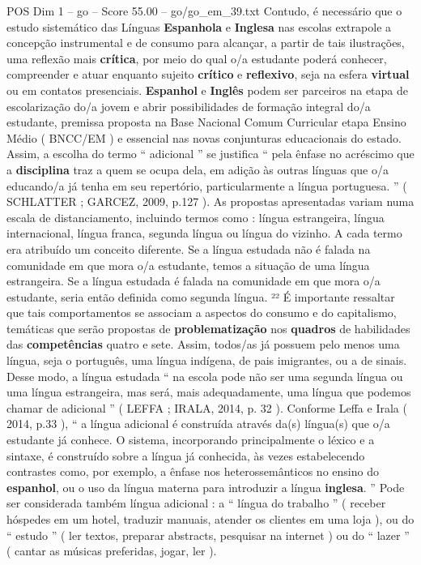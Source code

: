\begin{textsample}{POS Dim 1 – go – Score 55.00 – go/go\_em\_39.txt}
Contudo, é necessário que o estudo sistemático das Línguas \textbf{Espanhola} e \textbf{Inglesa} nas escolas extrapole a concepção instrumental e de consumo para alcançar, a partir de tais ilustrações, uma reflexão mais \textbf{crítica}, por meio do qual o/a estudante poderá conhecer, compreender e atuar enquanto sujeito \textbf{crítico} e \textbf{reflexivo}, seja na esfera \textbf{virtual} ou em contatos presenciais. \textbf{Espanhol} e \textbf{Inglês} podem ser parceiros na etapa de escolarização do/a jovem e abrir possibilidades de formação integral do/a estudante, premissa proposta na Base Nacional Comum Curricular etapa Ensino Médio ( BNCC/EM ) e essencial nas novas conjunturas educacionais do estado.
Assim, a escolha do termo “ adicional ” se justifica “ pela ênfase no acréscimo que a \textbf{disciplina} traz a quem se ocupa dela, em adição às outras línguas que o/a educando/a já tenha em seu repertório, particularmente a língua portuguesa. ” ( SCHLATTER ; GARCEZ, 2009, p.127 ).
As propostas apresentadas variam numa escala de distanciamento, incluindo termos como : língua estrangeira, língua internacional, língua franca, segunda língua ou língua do vizinho.
A cada termo era atribuído um conceito diferente.
Se a língua estudada não é falada na comunidade em que mora o/a estudante, temos a situação de uma língua estrangeira.
Se a língua estudada é falada na comunidade em que mora o/a estudante, seria então definida como segunda língua. ²² É importante ressaltar que tais comportamentos se associam a aspectos do consumo e do capitalismo, temáticas que serão propostas de \textbf{problematização} nos \textbf{quadros} de habilidades das \textbf{competências} quatro e sete.
Assim, todos/as já possuem pelo menos uma língua, seja o português, uma língua indígena, de pais imigrantes, ou a de sinais.
Desse modo, a língua estudada “ na escola pode não ser uma segunda língua ou uma língua estrangeira, mas será, mais adequadamente, uma língua que podemos chamar de adicional ” ( LEFFA ; IRALA, 2014, p. 32 ).
Conforme Leffa e Irala ( 2014, p.33 ), “ a língua adicional é construída através da(s) língua(s) que o/a estudante já conhece.
O sistema, incorporando principalmente o léxico e a sintaxe, é construído sobre a língua já conhecida, às vezes estabelecendo contrastes como, por exemplo, a ênfase nos heterossemânticos no ensino do \textbf{espanhol}, ou o uso da língua materna para introduzir a língua \textbf{inglesa}. ” Pode ser considerada também língua adicional : a “ língua do trabalho ” ( receber hóspedes em um hotel, traduzir manuais, atender os clientes em uma loja ), ou do “ estudo ” ( ler textos, preparar abstracts, pesquisar na internet ) ou do “ lazer ” ( cantar as músicas preferidas, jogar, ler ).

\end{textsample}
